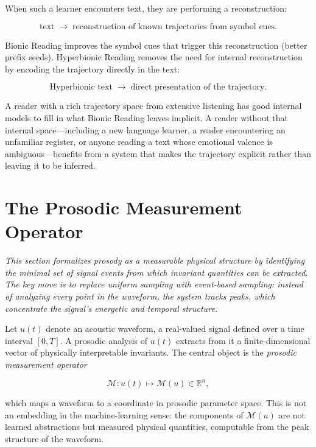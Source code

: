 \documentclass[12pt, a4paper]{article}
\begin{document}
When such a learner encounters text, they are performing a reconstruction:

\begin{equation}
\text{text} \;\to\; \text{reconstruction of known trajectories from symbol cues}.
\label{eq:listening_reconstruction}
\end{equation}

Bionic Reading improves the symbol cues that trigger this reconstruction (better prefix seeds). Hyperbionic Reading removes the need for internal reconstruction by encoding the trajectory directly in the text:

\begin{equation}
\text{Hyperbionic text} \;\to\; \text{direct presentation of the trajectory}.
\label{eq:hyperbionic_direct}
\end{equation}

A reader with a rich trajectory space from extensive listening has good internal models to fill in what Bionic Reading leaves implicit. A reader without that internal space---including a new language learner, a reader encountering an unfamiliar register, or anyone reading a text whose emotional valence is ambiguous---benefits from a system that makes the trajectory explicit rather than leaving it to be inferred.

\section{The Prosodic Measurement Operator}

\noindent\textit{This section formalizes prosody as a measurable physical structure by identifying the minimal set of signal events from which invariant quantities can be extracted. The key move is to replace uniform sampling with event-based sampling: instead of analyzing every point in the waveform, the system tracks peaks, which concentrate the signal's energetic and temporal structure.}


Let $u(t)$ denote an acoustic waveform, a real-valued signal defined over a time interval $[0, T]$. A prosodic analysis of $u(t)$ extracts from it a finite-dimensional vector of physically interpretable invariants. The central object is the \emph{prosodic measurement operator}

\begin{equation}
\mathcal{M} : u(t) \mapsto \mathcal{M}(u) \in \mathbb{R}^n,
\label{eq:M}
\end{equation}

which maps a waveform to a coordinate in prosodic parameter space. This is not an embedding in the machine-learning sense: the components of $\mathcal{M}(u)$ are not learned abstractions but measured physical quantities, computable from the peak structure of the waveform.
\end{document}
